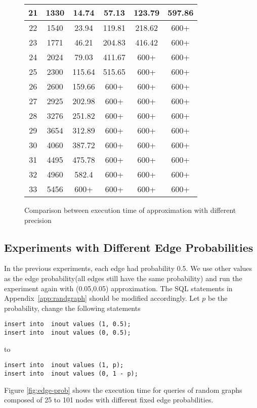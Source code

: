 \begin{figure}[htp]
\begin{center}
\begin{tabular}{ | c | c | c | c | c | c | }
	21 & 1330 & 14.74 & 57.13 & 123.79 &  597.86  \\ \hline
	22 & 1540 & 23.94 & 119.81 & 218.62 & 600+   \\ \hline
	23 & 1771 & 46.21 & 204.83 & 416.42 & 600+  \\ \hline
	24 & 2024 & 79.03 & 411.67 & 600+ & 600+  \\ \hline
	25 & 2300 & 115.64 & 515.65 & 600+ & 600+  \\ \hline
	26 & 2600 & 159.66 & 600+ & 600+ & 600+  \\ \hline
	27 & 2925 & 202.98 & 600+ & 600+ & 600+  \\ \hline
	28 & 3276 & 251.82 & 600+ & 600+ & 600+  \\ \hline
	29 & 3654 & 312.89 & 600+ & 600+ & 600+  \\ \hline
	30 & 4060 & 387.72 & 600+ & 600+ & 600+  \\ \hline
	31 & 4495 & 475.78 & 600+ & 600+ & 600+  \\ \hline
	32 & 4960 & 582.4 & 600+ & 600+ & 600+  \\ \hline
	33 & 5456 & 600+ & 600+ & 600+ & 600+  \\ \hline

  \end{tabular}
\end{center} 

\caption{Comparison between execution time of approximation with different precision}

\label{fig:randgraph}
\end{figure}

\subsection{Experiments with Different Edge Probabilities}  

In the previous experiments, each edge had probability 0.5. We use other values as the edge probability(all edges still have the same probability) and run the experiment again with (0.05,0.05) approximation. The SQL statements in Appendix~\ref{app:randgraph} should be modified accordingly. Let $p$ be the probability, change the following statements
\begin{verbatim}
insert into  inout values (1, 0.5); 
insert into  inout values (0, 0.5); 
\end{verbatim}
 to
\begin{verbatim}
insert into  inout values (1, p); 
insert into  inout values (0, 1 - p); 
\end{verbatim}
Figure \ref{fig:edge-prob} shows the execution time for queries of random graphs composed of 25 to 101 nodes with different fixed edge probabilities.


